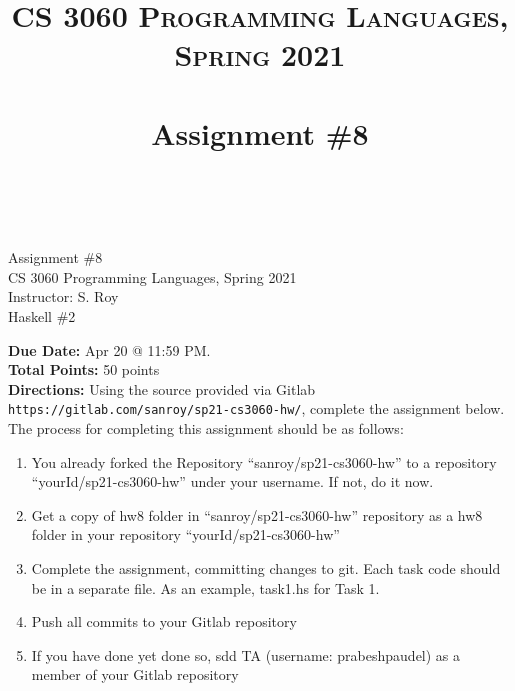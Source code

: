 \documentclass[paper=letter, fontsize=11pt]{scrartcl} %
\title{ 
    \normalfont \normalsize 
    \textsc{CS 3060 Programming Languages, Spring 2021} \\ [25pt] %
    \horrule{0.5pt} \\[0.4cm] %
    \huge Assignment \#8  \\ %
    \horrule{2pt} \\[0.5cm] %
}
\begin{document}
    \begin{center}
         Assignment \#8\\
        \small CS 3060 Programming Languages, Spring 2021 \\
        \small Instructor: S. Roy \\
        \huge Haskell \#2
    \end{center}
    
    \textbf{Due Date:} Apr 20 @ 11:59 PM. \\
    \textbf{Total Points:} 50 points \\

    \textbf{Directions:} Using the source provided via Gitlab \@ \texttt{https://gitlab.com/sanroy/sp21-cs3060-hw/},
complete the assignment below. The process for completing this assignment should be as follows:

    \begin{enumerate}[noitemsep]
        \item You already forked the Repository ``sanroy/sp21-cs3060-hw'' to a repository ``yourId/sp21-cs3060-hw'' under your username. If not, do it now.
        \item Get a copy of hw8 folder in ``sanroy/sp21-cs3060-hw'' repository as a hw8 folder in your repository ``yourId/sp21-cs3060-hw''
        \item Complete the assignment, committing changes to git. Each task code should be in a separate file. As an example, task1.hs for Task 1.
        \item Push all commits to your Gitlab repository
        \item If you have done yet done so, sdd TA (username: prabeshpaudel) as a member of your Gitlab repository
    \end{enumerate}
\end{document}
